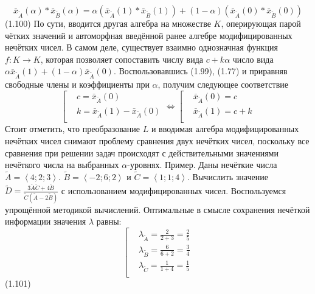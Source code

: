 	\[{{\bar{x}}_{{\tilde{A}}}}\left( \alpha  \right)*{{\bar{x}}_{{\tilde{B}}}}\left( \alpha  \right)=\alpha \left( {{{\bar{x}}}_{{\tilde{A}}}}\left( 1 \right)*{{{\bar{x}}}_{{\tilde{B}}}}\left( 1 \right) \right)+\left( 1-\alpha  \right)\left( {{{\bar{x}}}_{{\tilde{A}}}}\left( 0 \right)*{{{\bar{x}}}_{{\tilde{B}}}}\left( 0 \right) \right)\] 	(1.100)
По сути, вводится другая алгебра на множестве $K$, оперирующая парой чётких значений и автоморфная введённой ранее алгебре модифицированных нечётких чисел. В самом деле, существует взаимно однозначная функция $f:K\to K$, которая позволяет сопоставить числу вида $c+k\alpha $ число вида $\alpha {{\bar{x}}_{{\tilde{A}}}}\left( 1 \right)+\left( 1-\alpha  \right){{\bar{x}}_{{\tilde{A}}}}\left( 0 \right)$. Воспользовавшись (1.99), (1.77) и приравняв свободные члены и коэффициенты при $\alpha$, получим следующее соответствие
	\[\left[ \begin{aligned}
  & c={{{\bar{x}}}_{{\tilde{A}}}}\left( 0 \right) \\ 
 & k={{{\bar{x}}}_{{\tilde{A}}}}\left( 1 \right)-{{{\bar{x}}}_{{\tilde{A}}}}\left( 0 \right) \\ 
\end{aligned} \right.\Leftrightarrow \left[ \begin{aligned}
  & {{{\bar{x}}}_{{\tilde{A}}}}\left( 0 \right)=c \\ 
 & {{{\bar{x}}}_{{\tilde{A}}}}\left( 1 \right)=c+k \\ 
\end{aligned} \right.\] 
Стоит отметить, что преобразование $L$ и вводимая алгебра модифицированных нечётких чисел снимают проблему сравнения двух нечётких чисел, поскольку все сравнения при решении задач происходят с действительными значениями нечёткого числа на выбранных $\alpha$-уровнях.
Пример. Даны нечёткие числа $\tilde{A}=\left\langle 4;2;3 \right\rangle $. $\tilde{B}=\left\langle -2;6;2 \right\rangle $ и $\tilde{C}=\left\langle 1;1;4 \right\rangle $. Вычислить значение $\tilde{D}=\frac{3\tilde{A}\tilde{C}+4\tilde{B}}{\tilde{C}\left( \tilde{A}-2\tilde{B} \right)}$ с использованием модифицированных чисел.
Воспользуемся упрощённой методикой вычислений. Оптимальные в смысле сохранения нечёткой информации значения $\lambda$ равны:
	\[\left[ \begin{aligned}
  & {{\lambda }_{{\tilde{A}}}}=\frac{2}{2+3}=\frac{2}{5} \\ 
 & {{\lambda }_{{\tilde{B}}}}=\frac{6}{6+2}=\frac{3}{4} \\ 
 & {{\lambda }_{{\tilde{C}}}}=\frac{1}{1+4}=\frac{1}{5} \\ 
\end{aligned} \right.\] 	(1.101)
